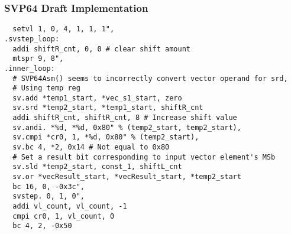 \subsubsection{\acrshort{SVP64} Draft Implementation}

\begin{verbatim}
  setvl 1, 0, 4, 1, 1, 1",
.svstep_loop:
  addi shiftR_cnt, 0, 0 # clear shift amount
  mtspr 9, 8",
.inner_loop:
  # SVP64Asm() seems to incorrectly convert vector operand for srd,
  # Using temp reg
  sv.add *temp1_start, *vec_s1_start, zero
  sv.srd *temp2_start, *temp1_start, shiftR_cnt
  addi shiftR_cnt, shiftR_cnt, 8 # Increase shift value
  sv.andi. *%d, *%d, 0x80" % (temp2_start, temp2_start),
  sv.cmpi *cr0, 1, *%d, 0x80" % (temp2_start),
  sv.bc 4, *2, 0x14 # Not equal to 0x80
  # Set a result bit corresponding to input vector element's MSb
  sv.sld *temp2_start, const_1, shiftL_cnt
  sv.or *vecResult_start, *vecResult_start, *temp2_start
  bc 16, 0, -0x3c",
  svstep. 0, 1, 0",
  addi vl_count, vl_count, -1
  cmpi cr0, 1, vl_count, 0
  bc 4, 2, -0x50
\end{verbatim}
